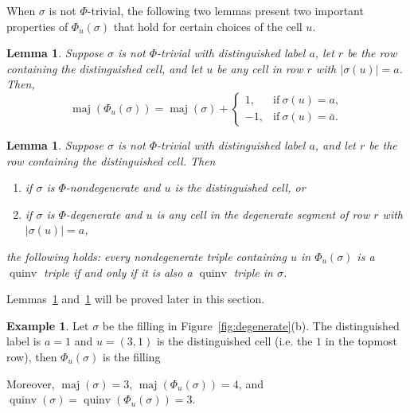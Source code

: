\documentclass[11pt]{article}
\newtheorem{lemma}[theo]{Lemma}
\theoremstyle{definition}
\newtheorem{example}[theo]{Example}
\numberwithin{equation}{section}
\DeclareMathOperator{\maj}{maj}
\DeclareMathOperator{\quinv}{quinv}
\newcommand\cell[3]{
\def\i{#1} \def\j{#2} \def\entry{#3}

\draw (\j-1,-\i)--(\j,-\i)--(\j,-\i+1)--(\j-1,-\i+1)--(\j-1,-\i);
\node at (\j-.5,-\i+.5) {\entry};
}
\begin{document}
When $\sigma$ is not $\Phi$-trivial, the following two lemmas present two important properties of $\Phi_u(\sigma)$ that hold for certain choices of the cell $u$.

\begin{lemma}\label{lem:Phi_u:maj}
Suppose $\sigma$ is not $\Phi$-trivial with distinguished label $a$, let $r$ be the row containing the distinguished cell, and let $u$ be any cell in row $r$ with $|\sigma(u)|=a$. 
Then, 
\begin{equation}
\maj(\Phi_u(\sigma))=\maj(\sigma)+\begin{cases}1,&\mbox{if}\ \sigma(u)=a,\\-1,&\mbox{if}\ \sigma(u)=\bar{a}.\end{cases}\end{equation}
\end{lemma}

\begin{lemma}\label{lem:Phi_u:quinv}
Suppose $\sigma$ is not $\Phi$-trivial with distinguished label $a$, and let $r$ be the row containing the distinguished cell. Then
\begin{enumerate}
\item if $\sigma$ is $\Phi$-nondegenerate and $u$ is the distinguished cell, or
\item if $\sigma$ is $\Phi$-degenerate and $u$ is any cell in the degenerate segment of row $r$ with $|\sigma(u)|=a$, 
\end{enumerate}
the following holds: every nondegenerate triple containing $u$ in $\Phi_u(\sigma)$  is a $\quinv$ triple if and only if it is also a $\quinv$ triple in $\sigma$.
\end{lemma}

Lemmas~\ref{lem:Phi_u:maj} and~\ref{lem:Phi_u:quinv} will be proved later in this section.

\begin{example}
Let $\sigma$ be the filling in Figure~\ref{fig:degenerate}(b). The distinguished label is $a=1$ and $u=(3,1)$ is the distinguished cell (i.e. the $1$ in the topmost row), then $\Phi_u(\sigma)$ is the filling

\begin{center}
\end{center}
Moreover, $\maj(\sigma)=3$, $\maj(\Phi_u(\sigma))=4$, and $\quinv(\sigma)=\quinv(\Phi_u(\sigma))=3$.
\end{example}
\end{document}
